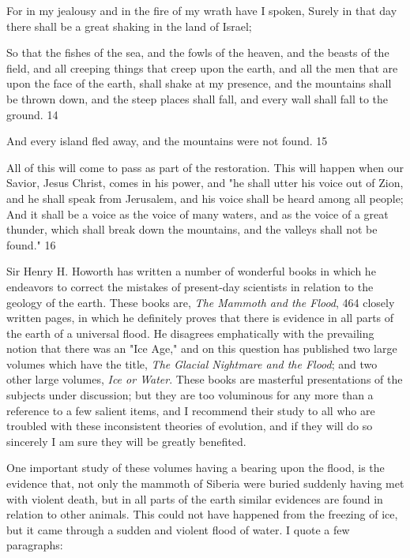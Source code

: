 For in my jealousy and in the fire of my wrath have I spoken, Surely in that day there shall be
a great shaking in the land of Israel;

So that the fishes of the sea, and the fowls of the heaven, and the beasts of the field, and all
creeping things that creep upon the earth, and all the men that are upon the face of the earth,
shall shake at my presence, and the mountains shall be thrown down, and the steep places
shall fall, and every wall shall fall to the ground. 14

And every island fled away, and the mountains were not found. 15

All of this will come to pass as part of the restoration. This will happen when our Savior,
Jesus Christ, comes in his power, and "he shall utter his voice out of Zion, and he shall speak
from Jerusalem, and his voice shall be heard among all people; And it shall be a voice as the
voice of many waters, and as the voice of a great thunder, which shall break down the
mountains, and the valleys shall not be found." 16

Sir Henry H. Howorth has written a number of wonderful books in which he endeavors to
correct the mistakes of present-day scientists in relation to the geology of the earth. These
books are, \textit{The Mammoth and the Flood}, 464 closely written pages, in which he definitely
proves that there is evidence in all parts of the earth of a universal flood. He disagrees
emphatically with the prevailing notion that there was an "Ice Age," and on this question has
published two large volumes which have the title, \textit{The Glacial Nightmare and the Flood}; and
two other large volumes, \textit{Ice or Water}. These books are masterful presentations of the
subjects under discussion; but they are too voluminous for any more than a reference to a few
salient items, and I recommend their study to all who are troubled with these inconsistent
theories of evolution, and if they will do so sincerely I am sure they will be greatly benefited.

One important study of these volumes having a bearing upon the flood, is the evidence that,
not only the mammoth of Siberia were buried suddenly having met with violent death, but in
all parts of the earth similar evidences are found in relation to other animals. This could not
have happened from the freezing of ice, but it came through a sudden and violent flood of
water. I quote a few paragraphs:

